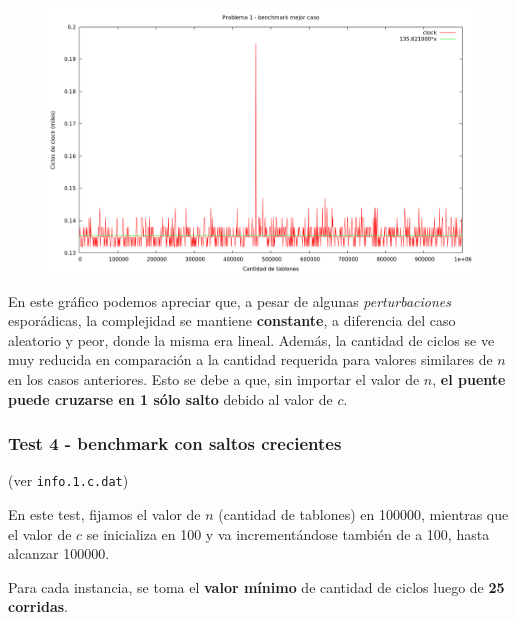 \begin{figure}[h]
  \begin{center}
    \includegraphics[scale=0.35]{imagenes/grafico-1-mejor.png}
  \end{center}
\end{figure}


En este gráfico podemos apreciar que, a pesar de algunas \textit{perturbaciones} esporádicas, la complejidad
se mantiene \textbf{constante}, a diferencia del caso aleatorio y peor, donde la misma era lineal. Además, la cantidad de
ciclos se ve muy reducida en comparación a la cantidad requerida para valores similares de $n$ en los casos anteriores. 
Esto se debe a que, sin importar el valor de $n$, \textbf{el puente puede cruzarse en 1 sólo salto} debido al valor de $c$.


\newpage


\subsubsection{Test 4 - benchmark con saltos crecientes}

(ver \verb|info.1.c.dat|) \medskip

En este test, fijamos el valor de $n$ (cantidad de tablones) en 100000, mientras que el valor de $c$ se 
inicializa en 100 y va incrementándose también de a 100, hasta alcanzar 100000.

Para cada instancia, se toma el \textbf{valor mínimo} de cantidad de ciclos luego de \textbf{25 corridas}.


